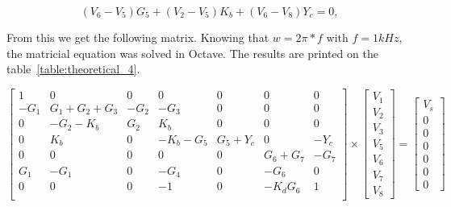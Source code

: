 \begin{equation}
   (V_{6} - V_{5})G_{5} + (V_{2} - V_{5})K_{b} + (V_{6} - V_{8})Y_{c} = 0,
  \label{eq:node67}
\end{equation}

From this we get the following matrix. Knowing that $w = 2\pi*f$ with $f = 1kHz$, the matricial equation was solved in Octave. The results are printed on the table~\ref{table:theoretical_4}.

\begin{equation}
\left[ \begin{array}{ccccccc} 
		1 & 0 & 0 & 0 & 0 & 0 & 0 \\ 
		-G_1 & G_1+G_2+G_3 & -G_2 & -G_3 & 0 & 0 & 0 \\
		0 & -G_2-K_b & G_2 & K_b & 0 & 0 & 0 \\ 
		0 & K_b & 0 & -K_b-G_5 & G_5+Y_c & 0 & -Y_c  \\ 
		0 & 0 & 0 & 0 & 0 & G_6+G_7 & -G_7  \\ 
		G_1 & -G_1 & 0 & -G_4 & 0 & -G_6 & 0  \\ 
		0 & 0 & 0 & -1 & 0 & -K_dG_6 & 1 \\ 

\end{array} \right]
\times \left[ \begin{array}{c} V_1 \\ V_2 \\ V_3 \\  V_5 \\ V_6 \\ V_7 \\ V_8 \end{array} \right] =
\left[ \begin{array}{c} V_s \\ 0 \\ 0 \\ 0 \\ 0 \\ 0 \\ 0  \end{array} \right]
\label{eq:nodalmatrix4}
\end{equation}


